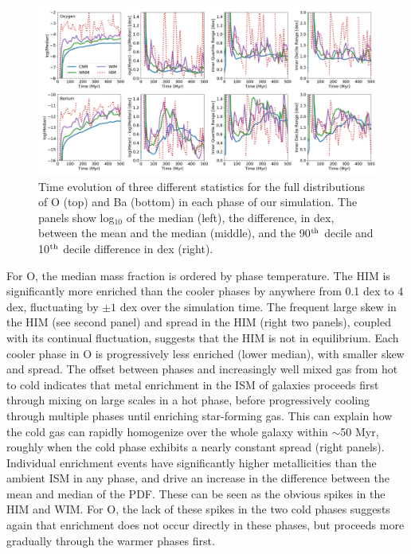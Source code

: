 \documentclass[twocolumn]{aastex61}
\begin{document}
\begin{figure}
\centering
\includegraphics[width=0.95\linewidth]{O_Ba_distribution_evolution.png}
\caption{Time evolution of three different statistics for the full distributions of O (top) and Ba (bottom) in each phase of our simulation. The panels show log$_{10}$ of the median (left), the difference, in dex, between the mean and the median (middle), and the 90$^{\rm th}$ decile and 10$^{\rm th}$ decile difference in dex (right).}
\label{fig:phase-statistics}
\end{figure}

For O, the median mass fraction is ordered by phase temperature. The HIM is significantly more enriched than the cooler phases by anywhere from 0.1 dex to 4 dex, fluctuating by $\pm 1$ dex over the simulation time. The frequent large skew in the HIM (see second panel) and spread in the HIM (right two panels), coupled with its continual fluctuation, suggests that the HIM is not in equilibrium.
Each cooler phase in O is progressively less enriched (lower median), with smaller skew and spread. The offset between phases and increasingly well mixed gas from hot to cold indicates that metal enrichment in the ISM of galaxies proceeds first through mixing on large scales in a hot phase, before progressively cooling through multiple phases until enriching star-forming gas. This 
    can explain
how the cold gas can rapidly homogenize over the whole galaxy within $\sim$50 Myr, roughly when the cold phase exhibits a nearly constant spread (right panels). Individual enrichment events 
have significantly higher metallicities than the ambient ISM in any phase, and 
drive an increase in the difference between the mean and median of the PDF. These can be seen as the obvious spikes in the HIM and WIM. For O, the lack of these spikes in the two cold phases suggests again that enrichment does not occur directly in these phases, but proceeds more gradually through the warmer phases first.
\end{document}
